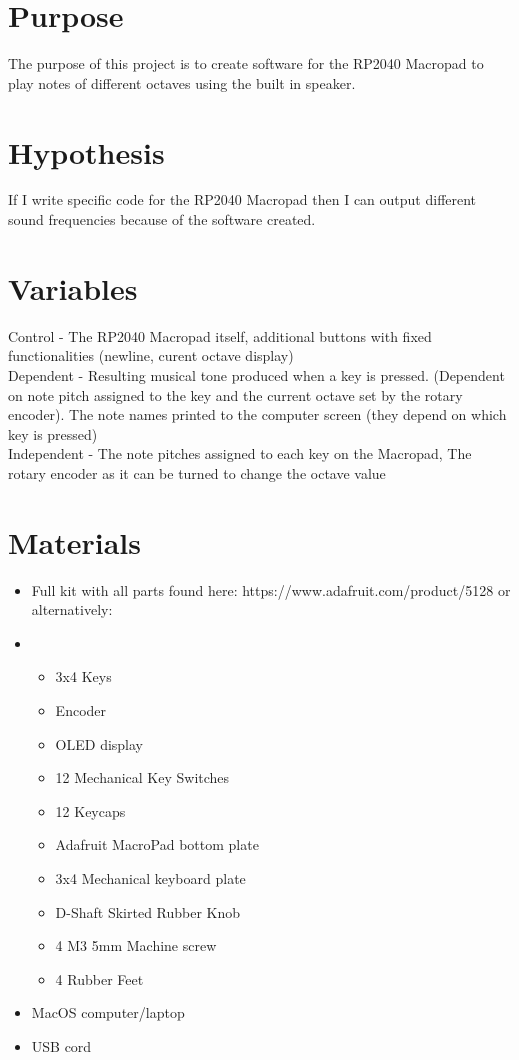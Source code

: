 \documentclass{article}
\begin{document}
\section{Purpose}

The purpose of this project is to create software for the RP2040 Macropad to play notes of different octaves using the built in speaker. 

\section{Hypothesis}

If I write specific code for the RP2040 Macropad then I can output different sound frequencies because of the software created.

\section{Variables}

Control - The RP2040 Macropad itself, additional buttons with fixed functionalities (newline, curent octave display) \\
Dependent - Resulting musical tone produced when a key is pressed. (Dependent on note pitch assigned to the key and the current octave set by the rotary encoder). The note names printed to the computer screen (they depend on which key is pressed)\\
Independent - The note pitches assigned to each key on the Macropad, The rotary encoder as it can be turned to change the octave value

\section{Materials}

\begin{itemize}
    \item Full kit with all parts found here: https://www.adafruit.com/product/5128 or alternatively:
    \item
        \begin{itemize}
            \item 3x4 Keys
            \item Encoder
            \item OLED display
            \item 12 Mechanical Key Switches
            \item 12 Keycaps
            \item Adafruit MacroPad bottom plate
            \item 3x4 Mechanical keyboard plate
            \item D-Shaft Skirted Rubber Knob
            \item 4 M3 5mm Machine screw
            \item 4 Rubber Feet
        \end{itemize}
    \item MacOS computer/laptop
    \item USB cord
\end{itemize}
\end{document}
